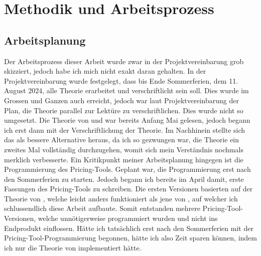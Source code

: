 \documentclass[11pt]{report} %
\begin{document}
\section{Methodik und Arbeitsprozess}
\subsection{Arbeitsplanung}
Der Arbeitsprozess dieser Arbeit wurde zwar in der Projektvereinbarung grob skizziert, jedoch habe ich mich nicht exakt daran gehalten. In der Projektvereinbarung wurde festgelegt, dass bis Ende Sommerferien, dem 11. August 2024, alle Theorie erarbeitet und verschriftlicht sein soll. Dies wurde im Grossen und Ganzen auch erreicht, jedoch war laut Projektvereinbarung der Plan, die Theorie parallel zur Lektüre zu verschriftlichen. Dies wurde nicht so umgesetzt. Die Theorie von \textcite{Adelmeyer2003} und \textcite{Roman2012-sk} war bereits Anfang Mai gelesen, jedoch begann ich erst dann mit der Verschriftlichung der Theorie. Im Nachhinein stellte sich das als bessere Alternative heraus, da ich so gezwungen war, die Theorie ein zweites Mal vollständig durchzugehen, womit sich mein Verständnis nochmals merklich verbesserte. Ein Kritikpunkt meiner Arbeitsplanung hingegen ist die Programmierung des Pricing-Tools. Geplant war, die Programmierung erst nach den Sommerferien zu starten. Jedoch begann ich bereits im April damit, erste Fassungen des Pricing-Tools zu schreiben. Die ersten Versionen basierten auf der Theorie von \textcite{Adelmeyer2003}, welche leicht anders funktioniert als jene von \textcite{Roman2012-sk}, auf welcher ich schlussendlich diese Arbeit aufbaute. Somit entstanden mehrere Pricing-Tool-Versionen, welche unnötigerweise programmiert wurden und nicht ins Endprodukt einflossen. Hätte ich tatsächlich erst nach den Sommerferien mit der Pricing-Tool-Programmierung begonnen, hätte ich also Zeit sparen können, indem ich nur die Theorie von \textcite{Roman2012-sk} implementiert hätte.
\end{document}
